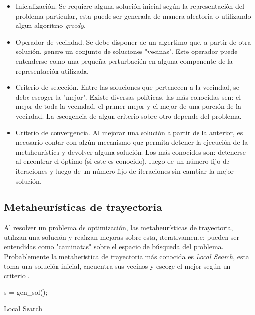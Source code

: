 \documentclass{ci5652}
\begin{document}
\begin{itemize}
  \item Inicialización. Se requiere alguna solución inicial según la 
  representación del problema particular, esta puede ser generada de manera
  aleatoria o utilizando algun algoritmo \textit{greedy}.
  \item Operador de vecindad. Se debe disponer de un algortimo que, a partir de
  otra solución, genere un conjunto de soluciones "vecinas". Este operador puede
  entenderse como una pequeña perturbación en alguna componente de la 
  representación utilizada.
  \item Criterio de selección. Entre las soluciones que pertenecen a la 
  vecindad, se debe escoger la "mejor". Existe diversas políticas, las más
  conocidas son: el mejor de toda la vecindad, el primer mejor y el mejor de una
  porción de la vecindad. La escogencia de algun criterio sobre otro depende del
  problema.
  \item Criterio de convergencia. Al mejorar una solución a partir de la 
  anterior, es necesario contar con algún mecanismo que permita detener la
  ejecución de la metaheurística y devolver alguna solución. Los más conocidos
  son: detenerse al encontrar el óptimo (si este es conocido), luego de un 
  número fijo de iteraciones y luego de un número fijo de iteraciones sin 
  cambiar la mejor solución.
  
\end{itemize}


\subsection{Metaheurísticas de trayectoria}

Al resolver un problema de optimización, las metaheurísticas de trayectoria,
utilizan una solución y realizan mejoras sobre esta, iterativamente; pueden ser
entendidas como "caminatas" sobre el espacio de búsqueda del problema. 
Probablemente la metaherística de trayectoria más conocida es 
\textit{Local Search}, esta toma una solución inicial, encuentra sus vecinos y
escoge el mejor según un criterio \cite{Talbi_2009}. 

\begin{algorithm}
 \DontPrintSemicolon
 \vspace*{0.1cm}
  s = gen\_sol();\;
 \vspace*{0.1cm}
 \caption{Local Search}
\end{algorithm}
\end{document}
